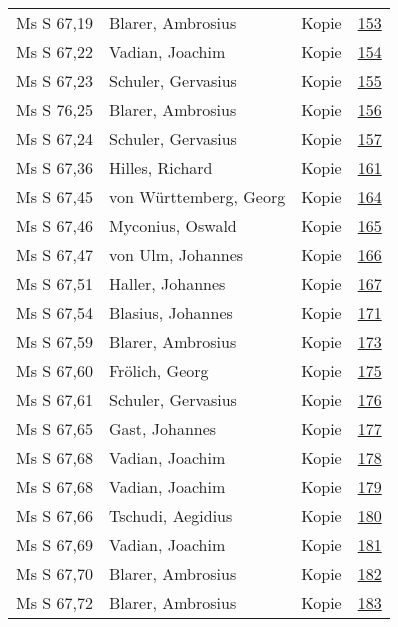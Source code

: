 \documentclass[10pt,a4paper,landscape]{report}
\begin{document}
\begin{longtable}{p{16cm}p{4cm}lr}
Ms S 67,19	&	Blarer, Ambrosius	&	Kopie	&	\href{http://130.60.24.72/assignment/153}{153}\\
Ms S 67,22	&	Vadian, Joachim	&	Kopie	&	\href{http://130.60.24.72/assignment/154}{154}\\
Ms S 67,23	&	Schuler, Gervasius	&	Kopie	&	\href{http://130.60.24.72/assignment/155}{155}\\
Ms S 76,25	&	Blarer, Ambrosius	&	Kopie	&	\href{http://130.60.24.72/assignment/156}{156}\\
Ms S 67,24	&	Schuler, Gervasius	&	Kopie	&	\href{http://130.60.24.72/assignment/157}{157}\\
Ms S 67,36	&	Hilles, Richard	&	Kopie	&	\href{http://130.60.24.72/assignment/161}{161}\\
Ms S 67,45	&	von Württemberg, Georg	&	Kopie	&	\href{http://130.60.24.72/assignment/164}{164}\\
Ms S 67,46	&	Myconius, Oswald	&	Kopie	&	\href{http://130.60.24.72/assignment/165}{165}\\
Ms S 67,47	&	von Ulm, Johannes	&	Kopie	&	\href{http://130.60.24.72/assignment/166}{166}\\
Ms S 67,51	&	Haller, Johannes	&	Kopie	&	\href{http://130.60.24.72/assignment/167}{167}\\
Ms S 67,54	&	Blasius, Johannes	&	Kopie	&	\href{http://130.60.24.72/assignment/171}{171}\\
Ms S 67,59	&	Blarer, Ambrosius	&	Kopie	&	\href{http://130.60.24.72/assignment/173}{173}\\
Ms S 67,60	&	Frölich, Georg	&	Kopie	&	\href{http://130.60.24.72/assignment/175}{175}\\
Ms S 67,61	&	Schuler, Gervasius	&	Kopie	&	\href{http://130.60.24.72/assignment/176}{176}\\
Ms S 67,65	&	Gast, Johannes	&	Kopie	&	\href{http://130.60.24.72/assignment/177}{177}\\
Ms S 67,68	&	Vadian, Joachim	&	Kopie	&	\href{http://130.60.24.72/assignment/178}{178}\\
Ms S 67,68	&	Vadian, Joachim	&	Kopie	&	\href{http://130.60.24.72/assignment/179}{179}\\
Ms S 67,66	&	Tschudi, Aegidius	&	Kopie	&	\href{http://130.60.24.72/assignment/180}{180}\\
Ms S 67,69	&	Vadian, Joachim	&	Kopie	&	\href{http://130.60.24.72/assignment/181}{181}\\
Ms S 67,70	&	Blarer, Ambrosius	&	Kopie	&	\href{http://130.60.24.72/assignment/182}{182}\\
Ms S 67,72	&	Blarer, Ambrosius	&	Kopie	&	\href{http://130.60.24.72/assignment/183}{183}\\

\end{longtable}
\end{document}
